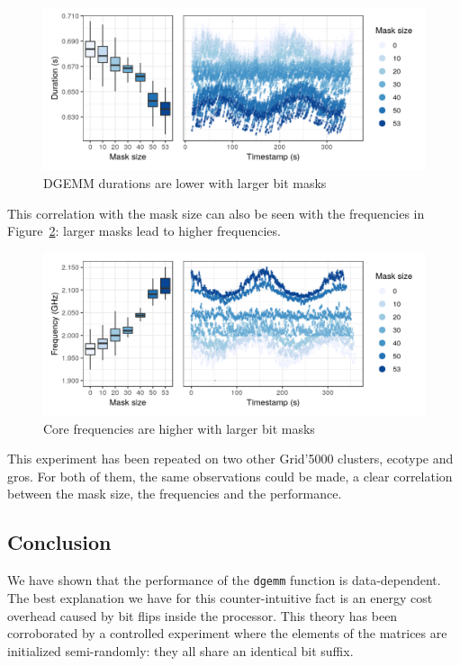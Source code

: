             \begin{figure}[htbp]
                \centering
                \includegraphics[width=\textwidth]{img/experiment/bit-flips/mask_size_perf.png}
                \caption{\label{fig:exp:bit-flips:mask-perf}
                DGEMM durations are lower with larger bit masks}
            \end{figure}

            This correlation with the mask size can also be seen with the frequencies in
            Figure~\ref{fig:exp:bit-flips:mask-freq}: larger masks lead to higher frequencies.

            \begin{figure}[htbp]
                \centering
                \includegraphics[width=\textwidth]{img/experiment/bit-flips/mask_size_freq.png}
                \caption{\label{fig:exp:bit-flips:mask-freq}
                Core frequencies are higher with larger bit masks}
            \end{figure}

            This experiment has been repeated on two other Grid'5000 clusters, ecotype and gros. For both of them, the
            same observations could be made, a clear correlation between the mask size, the frequencies and the
            performance.

        \subsection{Conclusion}
            We have shown that the performance of the \texttt{dgemm} function is data-dependent. The best explanation we
            have for this counter-intuitive fact is an energy cost overhead caused by bit flips inside the processor.
            This theory has been corroborated by a controlled experiment where the elements of the matrices are
            initialized semi-randomly: they all share an identical bit suffix.

